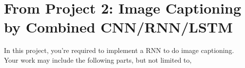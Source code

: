 \documentclass[11pt]{article}
\begin{document}
%
%
%
%

\section{From Project 2: Image Captioning by Combined CNN/RNN/LSTM}
In this project, you're required to implement a RNN to do image captioning. Your work may include the following parts, but not limited to, 
\end{document}
